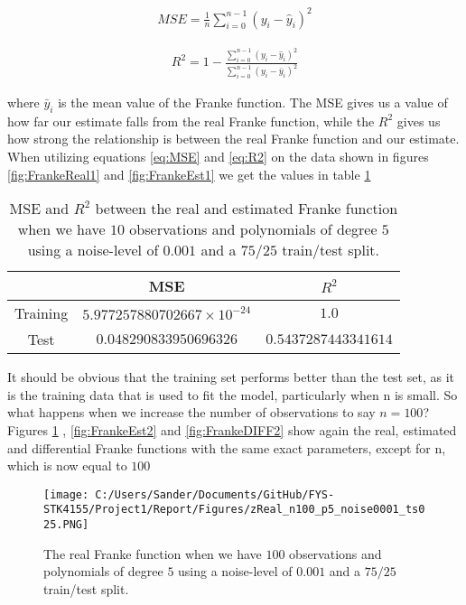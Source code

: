 \documentclass[12pt,a4paper]{article}
\begin{document}
\begin{equation}\label{eq:MSE}
\begin{aligned}
MSE = \frac{1}{n} \sum_{i=0}^{n-1}(y_i-\hat{y}_i)^2
\end{aligned}
\end{equation}

\begin{equation}\label{eq:R2}
\begin{aligned}
R^2 = 1- \frac{\sum_{i=0}^{n-1}(y_i-\hat{y}_i)^2}{\sum_{i=0}^{n-1}(y_i-\bar{y}_i)^2}
\end{aligned}
\end{equation}

\noindent where $\bar{y}_i$ is the mean value of the Franke function. The MSE gives us a value of how far our estimate falls from the real Franke function, while the $R^2$ gives us how strong the relationship is between the real Franke function and our estimate. When utilizing equations \ref{eq:MSE} and \ref{eq:R2} on the data shown in figures \ref{fig:FrankeReal1} and \ref{fig:FrankeEst1} we get the values in table \ref{tab:ESTREAL1}

\begin{table}[h]
\caption{\label{tab:ESTREAL1} MSE and $R^2$ between the real and estimated Franke function when we have $10$ observations and polynomials of degree $5$ using a noise-level of $0.001$ and a $75/25$ train/test split.}
\centering
\begin{tabular}{c|c|c}
 & MSE & $R^2$\\
\hline
Training & $5.977257880702667 \times 10^{-24}$ & $1.0$\\
\hline
Test & $0.048290833950696326$ & $0.5437287443341614$\\	  
\end{tabular}
\end{table}

\noindent It should be obvious that the training set performs better than the test set, as it is the training data that is used to fit the model, particularly when n is small. So what happens when we increase the number of observations to say $n = 100$? Figures \ref{fig:FrankeReal2} , \ref{fig:FrankeEst2} and \ref{fig:FrankeDIFF2} show again the real, estimated and differential Franke functions with the same exact parameters, except for n, which is now equal to $100$

\begin{figure}[H]
\centering
\texttt{[image: C:/Users/Sander/Documents/GitHub/FYS-STK4155/Project1/Report/Figures/zReal\_n100\_p5\_noise0001\_ts025.PNG]}
\caption{\label{fig:FrankeReal2} The real Franke function when we have $100$ observations and polynomials of degree $5$ using a noise-level of $0.001$ and a $75/25$ train/test split.}
\end{figure}
\end{document}
